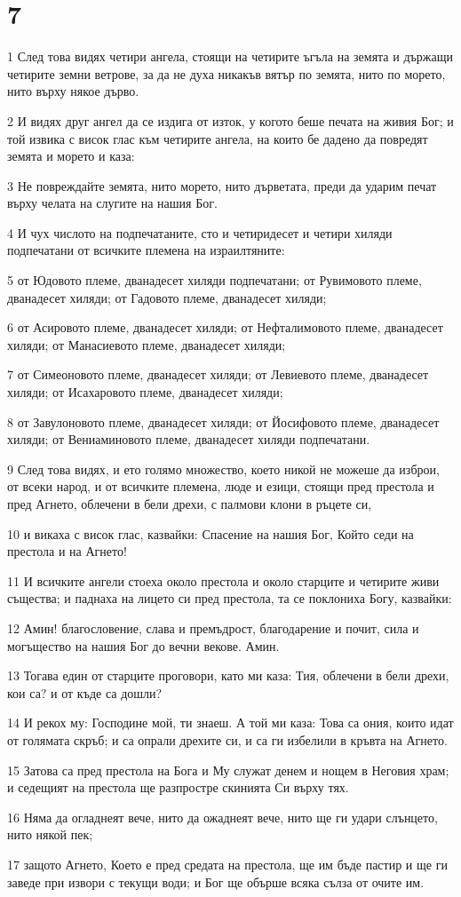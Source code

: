 \chapter{7}

\par 1 След това видях четири ангела, стоящи на четирите ъгъла на земята и държащи четирите земни ветрове, за да не духа никакъв вятър по земята, нито по морето, нито върху някое дърво.
\par 2 И видях друг ангел да се издига от изток, у когото беше печата на живия Бог; и той извика с висок глас към четирите ангела, на които бе дадено да повредят земята и морето и каза:
\par 3 Не повреждайте земята, нито морето, нито дърветата, преди да ударим печат върху челата на слугите на нашия Бог.
\par 4 И чух числото на подпечатаните, сто и четиридесет и четири хиляди подпечатани от всичките племена на израилтяните:
\par 5 от Юдовото племе, дванадесет хиляди подпечатани; от Рувимовото племе, дванадесет хиляди; от Гадовото племе, дванадесет хиляди;
\par 6 от Асировото племе, дванадесет хиляди; от Нефталимовото племе, дванадесет хиляди; от Манасиевото племе, дванадесет хиляди;
\par 7 от Симеоновото племе, дванадесет хиляди; от Левиевото племе, дванадесет хиляди; от Исахаровото племе, дванадесет хиляди;
\par 8 от Завулоновото племе, дванадесет хиляди; от Йосифовото племе, дванадесет хиляди; от Вениаминовото племе, дванадесет хиляди подпечатани.
\par 9 След това видях, и ето голямо множество, което никой не можеше да изброи, от всеки народ, и от всичките племена, люде и езици, стоящи пред престола и пред Агнето, облечени в бели дрехи, с палмови клони в ръцете си,
\par 10 и викаха с висок глас, казвайки: Спасение на нашия Бог, Който седи на престола и на Агнето!
\par 11 И всичките ангели стоеха около престола и около старците и четирите живи същества; и паднаха на лицето си пред престола, та се поклониха Богу, казвайки:
\par 12 Амин! благословение, слава и премъдрост, благодарение и почит, сила и могъщество на нашия Бог до вечни векове. Амин.
\par 13 Тогава един от старците проговори, като ми каза: Тия, облечени в бели дрехи, кои са? и от къде са дошли?
\par 14 И рекох му: Господине мой, ти знаеш. А той ми каза: Това са ония, които идат от голямата скръб; и са опрали дрехите си, и са ги избелили в кръвта на Агнето.
\par 15 Затова са пред престола на Бога и Му служат денем и нощем в Неговия храм; и седещият на престола ще разпростре скинията Си върху тях.
\par 16 Няма да огладнеят вече, нито да ожаднеят вече, нито ще ги удари слънцето, нито някой пек;
\par 17 защото Агнето, Което е пред средата на престола, ще им бъде пастир и ще ги заведе при извори с текущи води; и Бог ще обърше всяка сълза от очите им.


